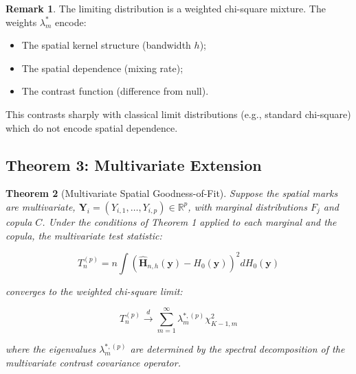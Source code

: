 \documentclass[12pt]{article}
\theoremstyle{plain}
\newtheorem{theorem}{Theorem}
\theoremstyle{definition}
\newtheorem{remark}[theorem]{Remark}
\newcommand{\dto}{\xrightarrow{d}}
\newcommand{\1}[1]{\mathbf{1}_{#1}}
\begin{document}
\begin{remark}
The limiting distribution is a weighted chi-square mixture. The weights $\lambda_m^*$ encode:
\begin{itemize}
\item The spatial kernel structure (bandwidth $h$);
\item The spatial dependence (mixing rate);
\item The contrast function (difference from null).
\end{itemize}

This contrasts sharply with classical limit distributions (e.g., standard chi-square) which do not encode spatial dependence.
\end{remark}

\subsection{Theorem 3: Multivariate Extension}

\begin{theorem}[Multivariate Spatial Goodness-of-Fit]
Suppose the spatial marks are multivariate, $\mathbf{Y}_i = (Y_{i,1}, \ldots, Y_{i,p}) \in \mathbb{R}^p$, with marginal distributions $F_j$ and copula $C$. Under the conditions of Theorem 1 applied to each marginal and the copula, the multivariate test statistic:

\begin{equation}
T_n^{(p)} = n \int \left(\widehat{\mathbf{H}}_{n,h}(\mathbf{y}) - H_0(\mathbf{y})\right)^2 dH_0(\mathbf{y})
\end{equation}

converges to the weighted chi-square limit:

\begin{equation}
T_n^{(p)} \dto \sum_{m=1}^\infty \lambda_m^{*,(p)} \chi^2_{K-1,m}
\end{equation}

where the eigenvalues $\lambda_m^{*,(p)}$ are determined by the spectral decomposition of the multivariate contrast covariance operator.
\end{theorem}
\end{document}
